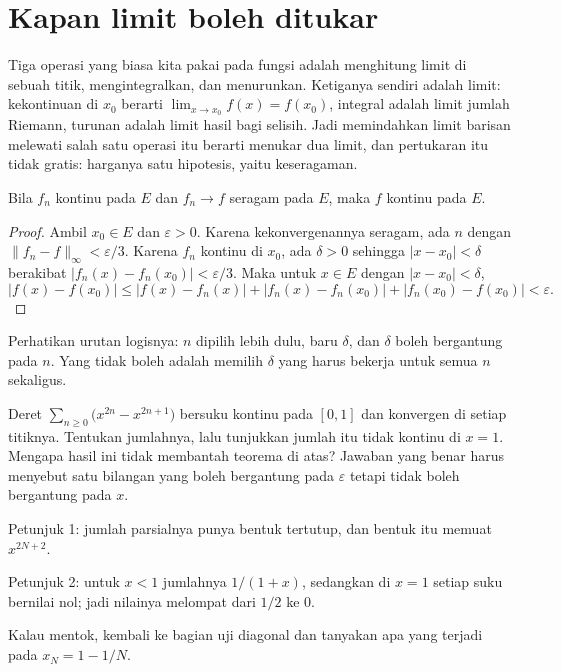 \section{Kapan limit boleh ditukar}

Tiga operasi yang biasa kita pakai pada fungsi adalah menghitung limit di
sebuah titik, mengintegralkan, dan menurunkan. Ketiganya sendiri adalah limit:
kekontinuan di $x_0$ berarti $\lim_{x\to x_0}f(x)=f(x_0)$, integral adalah
limit jumlah Riemann, turunan adalah limit hasil bagi selisih. Jadi memindahkan
limit barisan melewati salah satu operasi itu berarti menukar dua limit, dan
pertukaran itu tidak gratis: harganya satu hipotesis, yaitu
keseragaman.

\begin{teorema}
Bila $f_n$ kontinu pada $E$ dan $f_n\to f$ seragam pada $E$, maka $f$ kontinu
pada $E$.
\end{teorema}

\begin{proof}
Ambil $x_0\in E$ dan $\varepsilon>0$. Karena kekonvergenannya seragam, ada $n$
dengan $\|f_n-f\|_\infty<\varepsilon/3$. Karena $f_n$ kontinu di $x_0$, ada
$\delta>0$ sehingga $|x-x_0|<\delta$ berakibat $|f_n(x)-f_n(x_0)|<\varepsilon/3$.
Maka untuk $x\in E$ dengan $|x-x_0|<\delta$,
\[
  |f(x)-f(x_0)|\le|f(x)-f_n(x)|+|f_n(x)-f_n(x_0)|+|f_n(x_0)-f(x_0)|
  <\varepsilon .
\]
\end{proof}

Perhatikan urutan logisnya: $n$ dipilih lebih dulu, baru $\delta$, dan
$\delta$ boleh bergantung pada $n$. Yang tidak boleh adalah memilih $\delta$
yang harus bekerja untuk semua $n$ sekaligus.

\begin{tantangan}
Deret $\sum_{n\ge0}\bigl(x^{2n}-x^{2n+1}\bigr)$ bersuku kontinu pada $[0,1]$
dan konvergen di setiap titiknya. Tentukan jumlahnya, lalu tunjukkan jumlah itu
tidak kontinu di $x=1$. Mengapa hasil ini tidak membantah teorema di atas?
Jawaban yang benar harus menyebut satu bilangan yang boleh bergantung pada
$\varepsilon$ tetapi tidak boleh bergantung pada $x$.

Petunjuk 1: jumlah parsialnya punya bentuk tertutup, dan bentuk itu memuat
$x^{2N+2}$.

Petunjuk 2: untuk $x<1$ jumlahnya $1/(1+x)$, sedangkan di $x=1$ setiap suku
bernilai nol; jadi nilainya melompat dari $1/2$ ke $0$.

Kalau mentok, kembali ke bagian uji diagonal dan tanyakan apa yang terjadi pada
$x_N=1-1/N$.
\end{tantangan}

